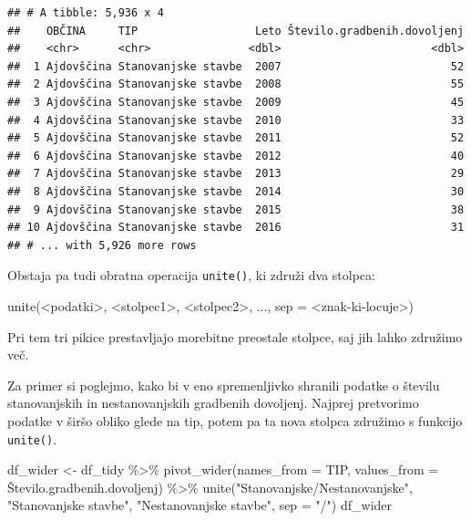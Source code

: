 \documentclass[
]{book}
\newenvironment{Shaded}{\begin{snugshade}}{\end{snugshade}}
\newcommand{\AttributeTok}[1]{\textcolor[rgb]{0.77,0.63,0.00}{#1}}
\newcommand{\FunctionTok}[1]{\textcolor[rgb]{0.00,0.00,0.00}{#1}}
\newcommand{\NormalTok}[1]{#1}
\newcommand{\OtherTok}[1]{\textcolor[rgb]{0.56,0.35,0.01}{#1}}
\newcommand{\SpecialCharTok}[1]{\textcolor[rgb]{0.00,0.00,0.00}{#1}}
\newcommand{\StringTok}[1]{\textcolor[rgb]{0.31,0.60,0.02}{#1}}
\begin{document}
\begin{verbatim}
## # A tibble: 5,936 x 4
##    OBČINA     TIP                  Leto Število.gradbenih.dovoljenj
##    <chr>      <chr>               <dbl>                       <dbl>
##  1 Ajdovščina Stanovanjske stavbe  2007                          52
##  2 Ajdovščina Stanovanjske stavbe  2008                          55
##  3 Ajdovščina Stanovanjske stavbe  2009                          45
##  4 Ajdovščina Stanovanjske stavbe  2010                          33
##  5 Ajdovščina Stanovanjske stavbe  2011                          52
##  6 Ajdovščina Stanovanjske stavbe  2012                          40
##  7 Ajdovščina Stanovanjske stavbe  2013                          29
##  8 Ajdovščina Stanovanjske stavbe  2014                          30
##  9 Ajdovščina Stanovanjske stavbe  2015                          38
## 10 Ajdovščina Stanovanjske stavbe  2016                          31
## # ... with 5,926 more rows
\end{verbatim}

Obstaja pa tudi obratna operacija \texttt{unite()}, ki združi dva stolpca:

\begin{Shaded}
\begin{Highlighting}[]
\FunctionTok{unite}\NormalTok{(}\SpecialCharTok{\textless{}}\NormalTok{podatki}\SpecialCharTok{\textgreater{}}\NormalTok{, }\SpecialCharTok{\textless{}}\NormalTok{stolpec1}\SpecialCharTok{\textgreater{}}\NormalTok{, }\SpecialCharTok{\textless{}}\NormalTok{stolpec2}\SpecialCharTok{\textgreater{}}\NormalTok{, ..., }\AttributeTok{sep =} \SpecialCharTok{\textless{}}\NormalTok{znak}\SpecialCharTok{{-}}\NormalTok{ki}\SpecialCharTok{{-}}\NormalTok{locuje}\SpecialCharTok{\textgreater{}}\NormalTok{)}
\end{Highlighting}
\end{Shaded}

Pri tem tri pikice prestavljajo morebitne preostale stolpce, saj jih lahko združimo več.

Za primer si poglejmo, kako bi v eno spremenljivko shranili podatke o številu stanovanjskih in nestanovanjskih gradbenih dovoljenj. Najprej pretvorimo podatke v širšo obliko glede na tip, potem pa ta nova stolpca združimo s funkcijo \texttt{unite()}.

\begin{Shaded}
\begin{Highlighting}[]
\NormalTok{df\_wider }\OtherTok{\textless{}{-}}\NormalTok{ df\_tidy }\SpecialCharTok{\%\textgreater{}\%}
  \FunctionTok{pivot\_wider}\NormalTok{(}\AttributeTok{names\_from =}\NormalTok{ TIP, }\AttributeTok{values\_from =}\NormalTok{ Število.gradbenih.dovoljenj) }\SpecialCharTok{\%\textgreater{}\%}
  \FunctionTok{unite}\NormalTok{(}\StringTok{"Stanovanjske/Nestanovanjske"}\NormalTok{, }
        \StringTok{"Stanovanjske stavbe"}\NormalTok{, }
        \StringTok{"Nestanovanjske stavbe"}\NormalTok{, }
        \AttributeTok{sep =} \StringTok{"/"}\NormalTok{)}
\NormalTok{df\_wider}
\end{Highlighting}
\end{Shaded}
\end{document}
